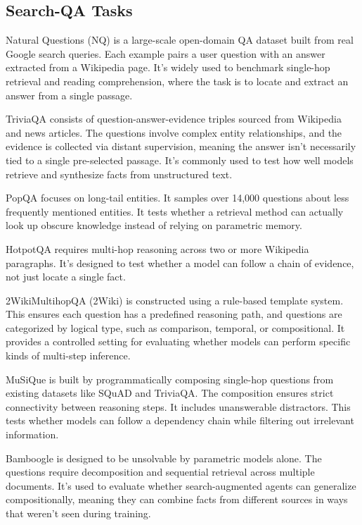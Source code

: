 \documentclass{llmxive}
\begin{document}
\subsection{Search-QA Tasks}
Natural Questions (NQ) is a large-scale open-domain QA dataset built from real Google search queries. Each example pairs a user question with an answer extracted from a Wikipedia page. It’s widely used to benchmark single-hop retrieval and reading comprehension, where the task is to locate and extract an answer from a single passage.

TriviaQA consists of question-answer-evidence triples sourced from Wikipedia and news articles. The questions involve complex entity relationships, and the evidence is collected via distant supervision, meaning the answer isn’t necessarily tied to a single pre-selected passage. It’s commonly used to test how well models retrieve and synthesize facts from unstructured text.

PopQA focuses on long-tail entities. It samples over 14,000 questions about less frequently mentioned entities. It tests whether a retrieval method can actually look up obscure knowledge instead of relying on parametric memory.

HotpotQA requires multi-hop reasoning across two or more Wikipedia paragraphs. It’s designed to test whether a model can follow a chain of evidence, not just locate a single fact.

2WikiMultihopQA (2Wiki) is constructed using a rule-based template system. This ensures each question has a predefined reasoning path, and questions are categorized by logical type, such as comparison, temporal, or compositional. It provides a controlled setting for evaluating whether models can perform specific kinds of multi-step inference.

MuSiQue is built by programmatically composing single-hop questions from existing datasets like SQuAD and TriviaQA. The composition ensures strict connectivity between reasoning steps. It includes unanswerable distractors. This tests whether models can follow a dependency chain while filtering out irrelevant information.

Bamboogle is designed to be unsolvable by parametric models alone. The questions require decomposition and sequential retrieval across multiple documents. It’s used to evaluate whether search-augmented agents can generalize compositionally, meaning they can combine facts from different sources in ways that weren’t seen during training.
\end{document}
